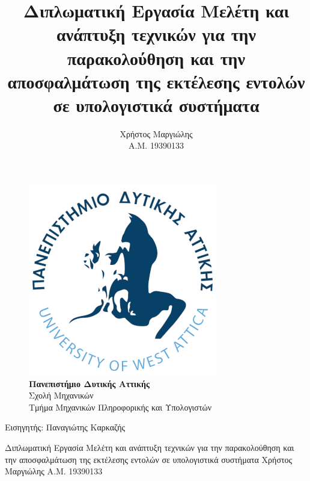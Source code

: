 \documentclass[12pt]{article}
\title{Διπλωματική Εργασία
\linebreak
\linebreak
Μελέτη και ανάπτυξη τεχνικών για την παρακολούθηση και την αποσφαλμάτωση της
εκτέλεσης εντολών σε υπολογιστικά συστήματα}
\author{Χρήστος Μαργιώλης \\ Α.Μ. 19390133}
\date{}
\begin{document}
\begin{titlepage}
        \clearpage\maketitle
	\thispagestyle{empty}
        \begin{figure}[t!]
        \begin{center}
        \includegraphics[scale=0.3]{./res/uniwalogo.png} \\
        \Large
	\textbf{Πανεπιστήμιο Δυτικής Αττικής} \\
        \large
	Σχολή Μηχανικών \\
        Τμήμα Μηχανικών Πληροφορικής και Υπολογιστών \\
        \end{center}
        \end{figure}
        \begin{center}
	Εισηγητής: Παναγιώτης Καρκαζής
        \end{center}
\end{titlepage}

\shipout\null


\begin{center}
Διπλωματική Εργασία
\linebreak
\linebreak
Μελέτη και ανάπτυξη τεχνικών για την παρακολούθηση και την αποσφαλμάτωση της
εκτέλεσης εντολών σε υπολογιστικά συστήματα
\linebreak
\linebreak
Χρήστος Μαργιώλης
\linebreak
Α.Μ. 19390133
\end{center}
\end{document}

